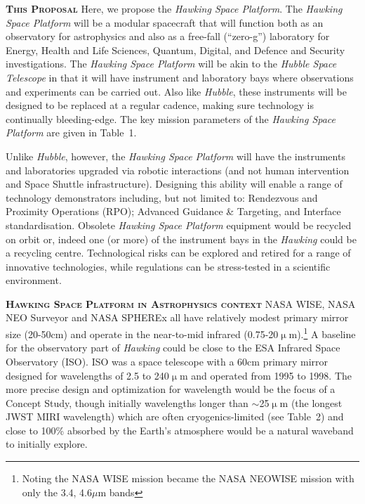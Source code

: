 \documentclass[a4paper,12pt]{texMemo}
\begin{document}
\smallskip \smallskip
\noindent
{\bfseries \textsc{\textcolor{Cerulean}{This Proposal}}}
Here, we propose 
the \textit{Hawking Space
Platform}. The \textit{Hawking Space Platform} will be a %
modular spacecraft that will function both as an observatory for
astrophysics and also as a free-fall (``zero-g'') laboratory for
Energy, Health and Life Sciences, Quantum, Digital, and Defence and Security  
investigations.  The \textit{Hawking Space
Platform} will be akin to the \textit{Hubble Space Telescope} in that
it will have instrument and laboratory bays where observations
and experiments can be carried out. Also like \textit{Hubble}, these
instruments will be designed to be replaced at a regular cadence,
making sure technology is continually bleeding-edge.
The key mission parameters of the \textit{Hawking Space Platform} are given in Table~1.

\smallskip \smallskip
\noindent
Unlike \textit{Hubble}, however, the \textit{Hawking Space Platform} will
have the instruments and laboratories upgraded via robotic
interactions (and not human intervention and Space Shuttle
infrastructure).  Designing this ability will enable a range of
technology demonstrators including, but not limited to: Rendezvous and
Proximity Operations (RPO); Advanced Guidance \& Targeting, and
Interface standardisation.  Obsolete \textit{Hawking
Space Platform} equipment would be recycled on orbit or, indeed one (or more) 
of the instrument bays in the \textit{Hawking} could be a recycling
centre. Technological risks can be explored  and retired for a range of
innovative technologies, while regulations can be stress-tested in a
scientific environment.

\smallskip \smallskip
\noindent
{\bfseries \textsc{\textcolor{Cerulean}{Hawking Space Platform in Astrophysics context}}}
NASA WISE, %
NASA NEO Surveyor and %
NASA SPHEREx %
all have relatively modest primary mirror size (20-50cm) and operate
in the near-to-mid infrared (0.75-20$\upmu$m).\footnote{Noting the
NASA WISE mission became the NASA NEOWISE mission with only the 3.4,
4.6$\mu$m bands} 
A baseline for the observatory part of \textit{Hawking} could be close 
to the ESA Infrared Space Observatory (ISO). 
ISO was a 
space telescope with a 60cm primary mirror designed for wavelengths of 2.5 to 240$\upmu$m and
operated from 1995 to 1998.  The more precise design and optimization
for wavelength would be the focus of a Concept Study, though initially
wavelengths longer than $\sim$25$\upmu$m (the longest JWST MIRI
wavelength) which are often cryogenics-limited (see
Table~2) and close to 100\% absorbed by the Earth's atmosphere would be a natural waveband to initially explore.
\end{document}
